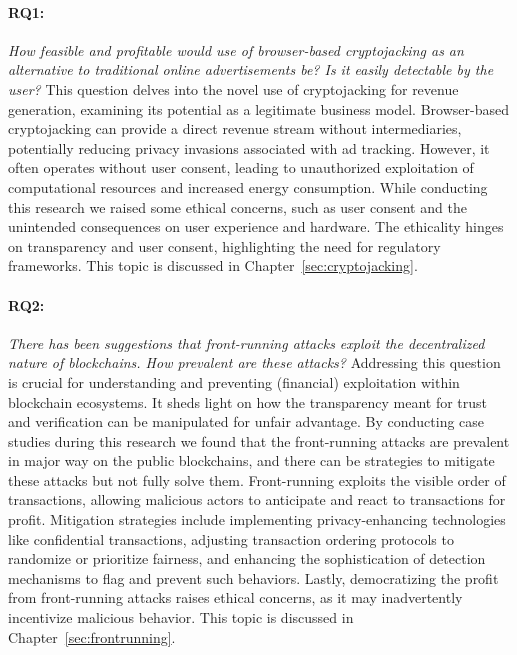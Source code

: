 \paragraph{RQ1:} \textit{How feasible and profitable would use of browser-based cryptojacking as an alternative to traditional online advertisements be? Is it easily detectable by the user?}
This question delves into the novel use of cryptojacking for revenue generation, examining its potential as a legitimate business model. Browser-based cryptojacking can provide a direct revenue stream without intermediaries, potentially reducing privacy invasions associated with ad tracking. However, it often operates without user consent, leading to unauthorized exploitation of computational resources and increased energy consumption. While conducting this research we raised some ethical concerns, such as user consent and the unintended consequences on user experience and hardware. The ethicality hinges on transparency and user consent, highlighting the need for regulatory frameworks. This topic is discussed in Chapter~\ref{sec:cryptojacking}. 

\paragraph{RQ2:} \textit{There has been suggestions that front-running attacks exploit the decentralized nature of blockchains. How prevalent are these attacks?}
Addressing this question is crucial for understanding and preventing (financial) exploitation within blockchain ecosystems. It sheds light on how the transparency meant for trust and verification can be manipulated for unfair advantage. By conducting case studies during this research we found that the front-running attacks are prevalent in major way on the public blockchains, and there can be strategies to mitigate these attacks but not fully solve them. Front-running exploits the visible order of transactions, allowing malicious actors to anticipate and react to transactions for profit. Mitigation strategies include implementing privacy-enhancing technologies like confidential transactions, adjusting transaction ordering protocols to randomize or prioritize fairness, and enhancing the sophistication of detection mechanisms to flag and prevent such behaviors. Lastly, democratizing the profit from front-running attacks raises ethical concerns, as it may inadvertently incentivize malicious behavior. This topic is discussed in Chapter~\ref{sec:frontrunning}.

